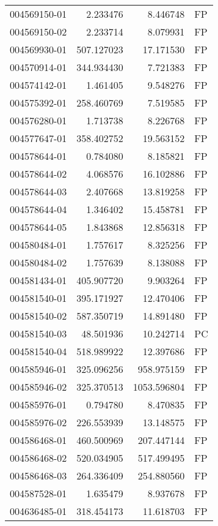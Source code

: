 \begin{tabular}{lrrl}
004569150-01 &    2.233476 &     8.446748 &   FP \\
004569150-02 &    2.233714 &     8.079931 &   FP \\
004569930-01 &  507.127023 &    17.171530 &   FP \\
004570914-01 &  344.934430 &     7.721383 &   FP \\
004574142-01 &    1.461405 &     9.548276 &   FP \\
004575392-01 &  258.460769 &     7.519585 &   FP \\
004576280-01 &    1.713738 &     8.226768 &   FP \\
004577647-01 &  358.402752 &    19.563152 &   FP \\
004578644-01 &    0.784080 &     8.185821 &   FP \\
004578644-02 &    4.068576 &    16.102886 &   FP \\
004578644-03 &    2.407668 &    13.819258 &   FP \\
004578644-04 &    1.346402 &    15.458781 &   FP \\
004578644-05 &    1.843868 &    12.856318 &   FP \\
004580484-01 &    1.757617 &     8.325256 &   FP \\
004580484-02 &    1.757639 &     8.138088 &   FP \\
004581434-01 &  405.907720 &     9.903264 &   FP \\
004581540-01 &  395.171927 &    12.470406 &   FP \\
004581540-02 &  587.350719 &    14.891480 &   FP \\
004581540-03 &   48.501936 &    10.242714 &   PC \\
004581540-04 &  518.989922 &    12.397686 &   FP \\
004585946-01 &  325.096256 &   958.975159 &   FP \\
004585946-02 &  325.370513 &  1053.596804 &   FP \\
004585976-01 &    0.794780 &     8.470835 &   FP \\
004585976-02 &  226.553939 &    13.148575 &   FP \\
004586468-01 &  460.500969 &   207.447144 &   FP \\
004586468-02 &  520.034905 &   517.499495 &   FP \\
004586468-03 &  264.336409 &   254.880560 &   FP \\
004587528-01 &    1.635479 &     8.937678 &   FP \\
004636485-01 &  318.454173 &    11.618703 &   FP \\

\end{tabular}
